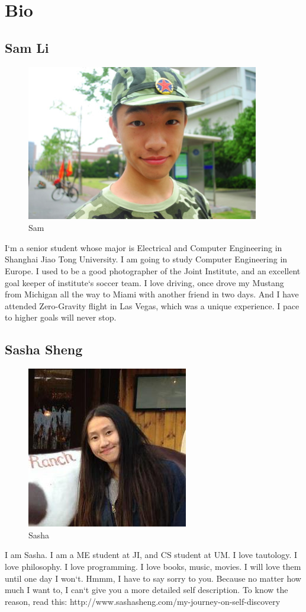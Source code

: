 \documentclass[paper=letter, fontsize=11pt]{scrartcl}
\numberwithin{equation}{section}		%
\numberwithin{figure}{section}			%
\numberwithin{table}{section}			%
\begin{document}
\pagebreak
\section{Bio}
\subsection{Sam Li}
\begin{figure}[H]
	\centering
	\includegraphics[scale=1]{lmt}
	\caption{Sam}
\end{figure}
I`m a senior student whose major is Electrical and Computer Engineering in Shanghai Jiao Tong University. I am going to study Computer Engineering in Europe. I used to be a good photographer of the Joint Institute, and an excellent goal keeper of institute`s soccer team. I love driving, once drove my Mustang from Michigan all the way to Miami with another friend in two days. And I have attended Zero-Gravity flight in Las Vegas, which was a unique experience. I pace to higher goals will never stop.
\pagebreak
\subsection{Sasha Sheng}
\begin{figure}[H]
	\centering
	\includegraphics[scale=1]{Profile}
	\caption{Sasha}
\end{figure}
I am Sasha. I am a ME student at JI, and CS student at UM. I love tautology. I love philosophy. I love programming. I love books, music, movies. I will love them until one day I won`t. Hmmm, I have to say sorry to you. Because no matter how much I want to, I can`t give you a more detailed self description. To know the reason, read this: http://www.sashasheng.com/my-journey-on-self-discovery
\pagebreak
\end{document}
